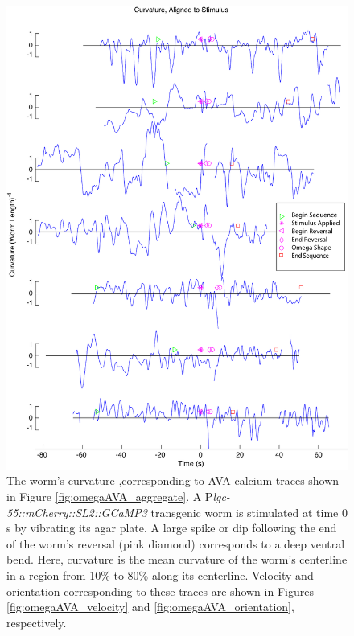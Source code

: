 \begin{figure}  %
\includegraphics[width=\textwidth]{figures/omegaAVA_curvature}
\caption[Corresponding curvature for seven sequences from four worms.]{The worm's curvature ,corresponding to AVA calcium traces shown in Figure \ref{fig:omegaAVA_aggregate}. A P\textit{lgc-55::mCherry::SL2::GCaMP3} transgenic worm is stimulated at time 0 s by vibrating its agar plate. A large spike or dip following the end of the worm's reversal (pink diamond) corresponds to a deep ventral bend. Here, curvature is the mean curvature of the worm's centerline in a region from 10\% to 80\% along its centerline. 
Velocity and orientation corresponding to these traces are shown in Figures \ref{fig:omegaAVA_velocity} and \ref{fig:omegaAVA_orientation}, respectively.  \label{fig:omegaAVA_curvature}}
\end{figure}


